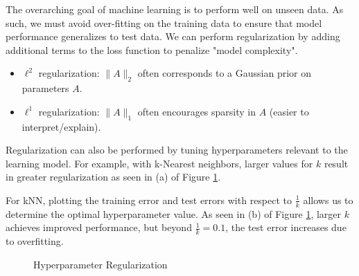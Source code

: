 \documentclass[twoside]{article}
\begin{document}
The overarching goal of machine learning is to perform well on unseen data. As such, we must avoid over-fitting on the training data to ensure that model performance generalizes to test data. We can perform regularization by adding additional terms to the loss function to penalize "model complexity". 

\begin{itemize}
\item $\ell^2$ regularization: $\|A\|_2$ often corresponds to a Gaussian prior on parameters $A$. 

\item $\ell^1$ regularization: $\|A\|_1$ often encourages sparsity in $A$ (easier to interpret/explain).
\end{itemize}

Regularization can also be performed by tuning hyperparameters relevant to the learning model. For example, with k-Nearest neighbors, larger values for $k$ result in greater regularization as seen in (a) of Figure \ref{fig:hyper_parameters}.

For kNN, plotting the training error and test errors with respect to $\frac{1}{k}$ allows us to determine the optimal hyperparameter value. As seen in (b) of Figure \ref{fig:hyper_parameters}, larger $k$ achieves improved performance, but beyond $\frac{1}{k} = 0.1$, the test error increases due to overfitting.

\begin{figure}[!ht]%
    \centering
    \qquad
    \caption{Hyperparameter Regularization}%
    \label{fig:hyper_parameters}%
\end{figure}
\end{document}
